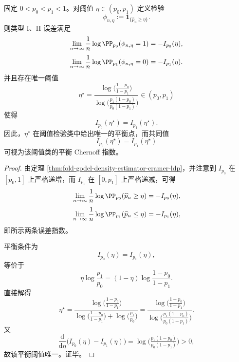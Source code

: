 \begin{corollary}\label{cor:fold-godel-density-estimator-optimal-threshold-test}
固定 \(0<p_0<p_1<1\)。对阈值 \(\eta\in(p_0,p_1)\) 定义检验
\[
\phi_{n,\eta}:=\mathbf 1_{\{\widehat p_n\ge \eta\}}.
\]
则类型 I、II 误差满足
\[
\lim_{n\to\infty}\frac1n\log \PP_{p_0}(\phi_{n,\eta}=1)
=
-I_{p_0}(\eta),
\]
\[
\lim_{n\to\infty}\frac1n\log \PP_{p_1}(\phi_{n,\eta}=0)
=
-I_{p_1}(\eta).
\]
并且存在唯一阈值
\[
\eta^\star=
\frac{\log\!\bigl(\frac{1-p_0}{1-p_1}\bigr)}
{\log\!\bigl(\frac{p_1(1-p_0)}{p_0(1-p_1)}\bigr)}
\in(p_0,p_1)
\]
使得
\[
I_{p_0}(\eta^\star)=I_{p_1}(\eta^\star).
\]
因此，\(\eta^\star\) 在阈值检验类中给出唯一的平衡点，而共同值
\[
I_{p_0}(\eta^\star)=I_{p_1}(\eta^\star)
\]
可视为该阈值类的平衡 Chernoff 指数。
\end{corollary}
\begin{proof}
由定理 \ref{thm:fold-godel-density-estimator-cramer-ldp}，并注意到 \(I_{p_0}\) 在 \([p_0,1]\) 上严格递增，而 \(I_{p_1}\) 在 \([0,p_1]\) 上严格递减，可得
\[
\lim_{n\to\infty}\frac1n\log \PP_{p_0}(\widehat p_n\ge \eta)
=
-I_{p_0}(\eta),
\]
\[
\lim_{n\to\infty}\frac1n\log \PP_{p_1}(\widehat p_n\le \eta)
=
-I_{p_1}(\eta),
\]
即所示两条误差指数。

平衡条件为
\[
I_{p_0}(\eta)=I_{p_1}(\eta),
\]
等价于
\[
\eta\log\frac{p_1}{p_0}
=(1-\eta)\log\frac{1-p_0}{1-p_1}.
\]
直接解得
\[
\eta^\star=
\frac{\log\!\bigl(\frac{1-p_0}{1-p_1}\bigr)}
{\log\!\bigl(\frac{1-p_0}{1-p_1}\bigr)+\log\!\bigl(\frac{p_1}{p_0}\bigr)}
=
\frac{\log\!\bigl(\frac{1-p_0}{1-p_1}\bigr)}
{\log\!\bigl(\frac{p_1(1-p_0)}{p_0(1-p_1)}\bigr)}.
\]
又
\[
\frac{\mathrm d}{\mathrm d\eta}\bigl(I_{p_0}(\eta)-I_{p_1}(\eta)\bigr)
=
\log\!\bigl(\tfrac{p_1(1-p_0)}{p_0(1-p_1)}\bigr)>0,
\]
故该平衡阈值唯一。证毕。
\end{proof}

